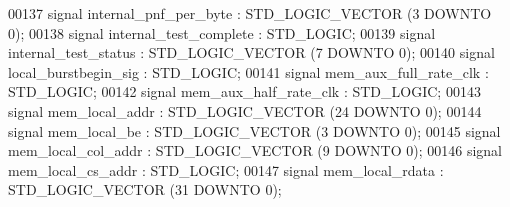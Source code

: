 \begin{DoxyCode}
{00137                 \textcolor{keywordflow}{signal} \textcolor{vhdlchar}{internal_pnf_per_byte} \textcolor{vhdlchar}{:}  \textcolor{comment}{STD\_LOGIC\_VECTOR} \textcolor{vhdlchar}{(}\textcolor{vhdllogic}{}\textcolor{vhdllogic}{3} \textcolor{keywordflow}{DOWNTO} \textcolor{vhdllogic}{}\textcolor{vhdllogic}{0}\textcolor{vhdlchar}{)};
00138                 \textcolor{keywordflow}{signal} \textcolor{vhdlchar}{internal_test_complete} \textcolor{vhdlchar}{:}  \textcolor{comment}{STD\_LOGIC};
00139                 \textcolor{keywordflow}{signal} \textcolor{vhdlchar}{internal_test_status} \textcolor{vhdlchar}{:}  \textcolor{comment}{STD\_LOGIC\_VECTOR} \textcolor{vhdlchar}{(}\textcolor{vhdllogic}{}\textcolor{vhdllogic}{7} \textcolor{keywordflow}{DOWNTO} \textcolor{vhdllogic}{}\textcolor{vhdllogic}{0}\textcolor{vhdlchar}{)};
00140                 \textcolor{keywordflow}{signal} \textcolor{vhdlchar}{local_burstbegin_sig} \textcolor{vhdlchar}{:}  \textcolor{comment}{STD\_LOGIC};
00141                 \textcolor{keywordflow}{signal} \textcolor{vhdlchar}{mem_aux_full_rate_clk} \textcolor{vhdlchar}{:}  \textcolor{comment}{STD\_LOGIC};
00142                 \textcolor{keywordflow}{signal} \textcolor{vhdlchar}{mem_aux_half_rate_clk} \textcolor{vhdlchar}{:}  \textcolor{comment}{STD\_LOGIC};
00143                 \textcolor{keywordflow}{signal} \textcolor{vhdlchar}{mem_local_addr} \textcolor{vhdlchar}{:}  \textcolor{comment}{STD\_LOGIC\_VECTOR} \textcolor{vhdlchar}{(}\textcolor{vhdllogic}{}\textcolor{vhdllogic}{24} \textcolor{keywordflow}{DOWNTO} \textcolor{vhdllogic}{}\textcolor{vhdllogic}{0}\textcolor{vhdlchar}{)};
00144                 \textcolor{keywordflow}{signal} \textcolor{vhdlchar}{mem_local_be} \textcolor{vhdlchar}{:}  \textcolor{comment}{STD\_LOGIC\_VECTOR} \textcolor{vhdlchar}{(}\textcolor{vhdllogic}{}\textcolor{vhdllogic}{3} \textcolor{keywordflow}{DOWNTO} \textcolor{vhdllogic}{}\textcolor{vhdllogic}{0}\textcolor{vhdlchar}{)};
00145                 \textcolor{keywordflow}{signal} \textcolor{vhdlchar}{mem_local_col_addr} \textcolor{vhdlchar}{:}  \textcolor{comment}{STD\_LOGIC\_VECTOR} \textcolor{vhdlchar}{(}\textcolor{vhdllogic}{}\textcolor{vhdllogic}{9} \textcolor{keywordflow}{DOWNTO} \textcolor{vhdllogic}{}\textcolor{vhdllogic}{0}\textcolor{vhdlchar}{)};
00146                 \textcolor{keywordflow}{signal} \textcolor{vhdlchar}{mem_local_cs_addr} \textcolor{vhdlchar}{:}  \textcolor{comment}{STD\_LOGIC};
00147                 \textcolor{keywordflow}{signal} \textcolor{vhdlchar}{mem_local_rdata} \textcolor{vhdlchar}{:}  \textcolor{comment}{STD\_LOGIC\_VECTOR} \textcolor{vhdlchar}{(}\textcolor{vhdllogic}{}\textcolor{vhdllogic}{31} \textcolor{keywordflow}{DOWNTO} \textcolor{vhdllogic}{}\textcolor{vhdllogic}{0}\textcolor{vhdlchar}{)};
}
\end{DoxyCode}
